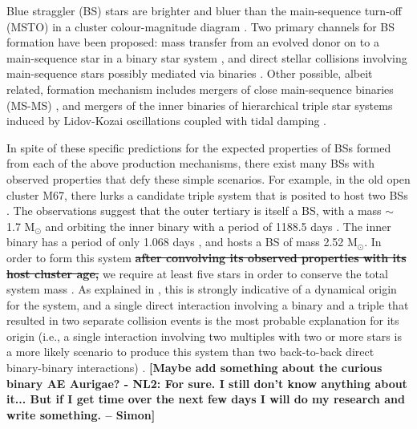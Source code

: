 \documentclass{aastex62}
\def\simon#1{{\bf {\color{red}[#1 -- Simon]}}}
\def\del#1{{\bf {\sout{#1}}}}
\begin{document}
Blue straggler (BS) stars are brighter and bluer than the
main-sequence turn-off (MSTO) in a cluster colour-magnitude diagram
\citep[e.g.][]{1953AJ.....58...61S,simunovic14,simunovic16}.  Two
primary channels for BS formation have been proposed: mass transfer
from an evolved donor on to a main-sequence star in a binary star
system
\citep[e.g.][]{mccrea64,1997A&A...328..143P,knigge09,mathieu09,leigh11,geller11,geller12,gosnell14,gosnell15},
and direct stellar collisions involving main-sequence stars possibly
mediated via binaries
\citep[e.g.][]{hills75,1997A&A...328..130P,shara97,leigh07,leigh11,leigh13,hypki13,2018arXiv181100058P}.
Other possible, albeit related, formation mechanism includes mergers
of close main-sequence binaries (MS-MS) \cite{2018arXiv181100058P},
and mergers of the inner binaries of hierarchical triple star systems
induced by Lidov-Kozai oscillations coupled with tidal damping
\citep[e.g.][]{perets09}.

In spite of these specific predictions for the expected properties of
BSs formed from each of the above production mechanisms, there exist
many BSs with observed properties that defy these simple scenarios.
For example, in the old open cluster M67, there lurks a candidate
triple system that is posited to host two BSs
\citep{vandenberg01,sandquist03}.  The observations suggest that the
outer tertiary is itself a BS, with a mass $\sim$ 1.7 M$_{\odot}$ and
orbiting the inner binary with a period of 1188.5 days
\citep{sandquist03}.  The inner binary has a period of only 1.068 days
\citep{vandenberg01}, and hosts a BS of mass 2.52 M$_{\odot}$.  In
order to form this system \del{after convolving its observed
  properties with its host cluster age,} we require at least five
stars in order to conserve the total system mass \citep{leigh11}.  As
explained in \citet{leigh11}, this is strongly indicative of a
dynamical origin for the system, and a single direct interaction
involving a binary and a triple that resulted in two separate
collision events is the most probable explanation for its origin
(i.e., a single interaction involving two multiples with two or more
stars is a more likely scenario to produce this system than two
back-to-back direct binary-binary interactions)
\citep{2004MNRAS.350..615G}.  \simon{Maybe add something about the
  curious binary AE Aurigae? - NL2: For sure.  I still don't know anything about it... But if I get time over the next few days I will do my research and write something.}
\end{document}
